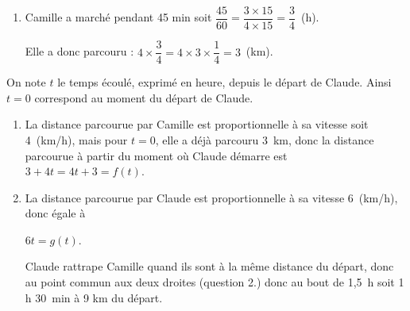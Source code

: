 \smallskip

\begin{enumerate}[resume]
\item %

Camille a marché pendant 45 min soit $\dfrac{45}{60} = \dfrac{3\times 15}{4 \times 15} = \dfrac{3}{4}$~(h).

Elle a donc parcouru : $4 \times \dfrac{3}{4} = 4 \times 3 \times \dfrac{1}{4} = 3$~(km).
\end{enumerate}

On note $t$ le temps écoulé, exprimé en heure, depuis le départ de Claude. Ainsi $t = 0$ correspond au moment du départ de Claude.

\begin{enumerate}[resume]
\item %

La distance parcourue par Camille est proportionnelle à sa vitesse soit 4~(km/h), mais pour $t = 0$, elle a déjà parcouru 3~km, donc la distance parcourue à partir du moment où Claude démarre est $3 + 4t = 4t + 3 = f(t)$.
\item %

La distance parcourue par Claude est proportionnelle à sa vitesse 6~(km/h), donc égale à 

$6t = g(t)$.

Claude rattrape Camille quand ils sont à la même distance du départ, donc au point commun aux deux droites (question 2.) donc au bout de 1,5~h soit 1 h 30~min à 9 km du départ.
\end{enumerate}

